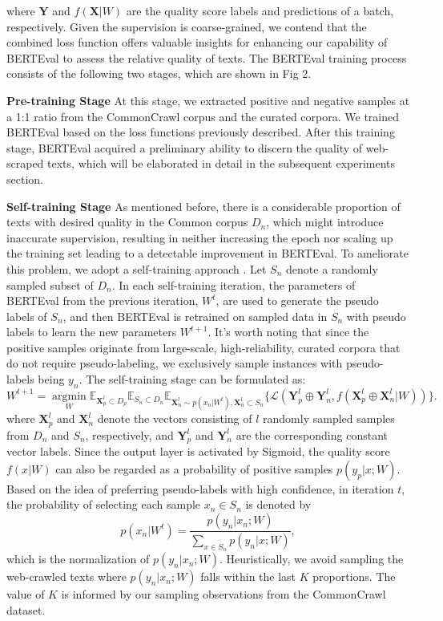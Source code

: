 \documentclass{article}
\begin{document}
where $\boldsymbol{Y}$ and $f(\boldsymbol{X} | W)$ are the quality score labels and predictions of a batch, respectively. Given the supervision is coarse-grained, we contend that the combined loss function offers valuable insights for enhancing our capability of BERTEval to assess the relative quality of texts. The BERTEval training process consists of the following two stages, which are shown in Fig 2.

\textbf{Pre-training Stage} At this stage, we extracted positive and negative samples at a 1:1 ratio from the CommonCrawl corpus and the curated corpora. We trained BERTEval based on the loss functions previously described. After this training stage, BERTEval acquired a preliminary ability to discern the quality of web-scraped texts, which will be elaborated in detail in the subsequent experiments section. 

\textbf{Self-training Stage} As mentioned before, there is a considerable proportion of texts with desired quality in the Common corpus $D_n$, which might introduce inaccurate supervision, resulting in neither increasing the epoch nor scaling up the training set leading to a detectable improvement in BERTEval. To ameliorate this problem, we adopt a self-training approach \cite{scudder1965probability}. Let $S_n$ denote a randomly sampled subset of $D_n$. In each self-training iteration, the parameters of BERTEval from the previous iteration, $W^t$, are used to generate the pseudo labels of $S_n$, and then BERTEval is retrained on sampled data in $S_n$ with pseudo labels to learn the new parameters $W^{t + 1}$\cite{mukherjee_uncertainty-aware_2020}. It's worth noting that since the positive samples originate from large-scale, high-reliability, curated corpora that do not require pseudo-labeling, we exclusively sample instances with pseudo-labels being $y_n$. The self-training stage can be formulated as:
\begin{equation}
W^{t+1} = \mathop{\arg\min} \limits_{W} \mathbb{E}_{\boldsymbol{X}_p^l \subset D_p} \mathbb{E}_{S_n \subset D_n} \mathbb{E}_{\boldsymbol{X}_n^l \sim p(x_n| W^{t}), \boldsymbol{X}_n^l \subset S_n}\{\mathcal{L}(\boldsymbol{Y}_p^l \oplus \boldsymbol{Y}_n^l, f(\boldsymbol{X}_p^l \oplus \boldsymbol{X}_n^l | W))\}.
\end{equation}
where $\boldsymbol{X}_p^l$ and $\boldsymbol{X}_n^l$ denote the vectors consisting of $l$ randomly sampled samples from $D_n$ and $S_n$, respectively, and $\boldsymbol{Y}_p^l$ and $\boldsymbol{Y}_n^l$ are the corresponding constant vector labels. Since the output layer is activated by Sigmoid, the quality score $f(x | W)$ can also be regarded as a probability of positive samples $p(y_p | x; W)$. Based on the idea of preferring pseudo-labels with high confidence, in iteration $t$, the probability of selecting each sample $x_n \in S_n$ is denoted by 
\begin{equation}
p(x_n|W^t) = \frac{p(y_n|x_n; W)}{\sum_{x \in S_n} p(y_n|x; W)},
\end{equation}
which is the normalization of $p(y_n|x_n; W)$. Heuristically, we avoid sampling the web-crawled texts where $p(y_n|x_n; W)$ falls within the last $K$ proportions. The value of $K$ is informed by our sampling observations from the CommonCrawl dataset. 
\end{document}
